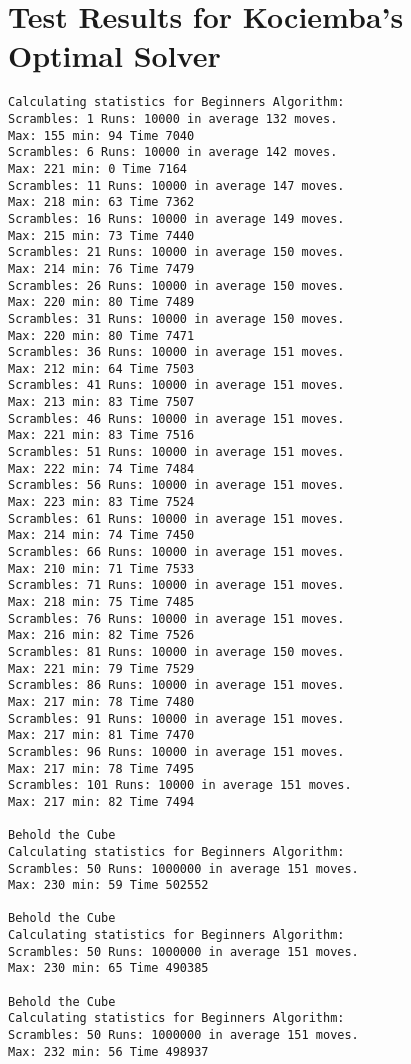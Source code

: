 \chapter{Test Results for Kociemba's Optimal Solver}
\label{chap:kociembaResults}
\emptyTop{}
\begin{lstlisting}[breaklines=true, basicstyle=\ttfamily\footnotesize]
Calculating statistics for Beginners Algorithm:
Scrambles: 1 Runs: 10000 in average 132 moves. 
Max: 155 min: 94 Time 7040
Scrambles: 6 Runs: 10000 in average 142 moves. 
Max: 221 min: 0 Time 7164
Scrambles: 11 Runs: 10000 in average 147 moves. 
Max: 218 min: 63 Time 7362
Scrambles: 16 Runs: 10000 in average 149 moves. 
Max: 215 min: 73 Time 7440
Scrambles: 21 Runs: 10000 in average 150 moves. 
Max: 214 min: 76 Time 7479
Scrambles: 26 Runs: 10000 in average 150 moves. 
Max: 220 min: 80 Time 7489
Scrambles: 31 Runs: 10000 in average 150 moves. 
Max: 220 min: 80 Time 7471
Scrambles: 36 Runs: 10000 in average 151 moves. 
Max: 212 min: 64 Time 7503
Scrambles: 41 Runs: 10000 in average 151 moves. 
Max: 213 min: 83 Time 7507
Scrambles: 46 Runs: 10000 in average 151 moves. 
Max: 221 min: 83 Time 7516
Scrambles: 51 Runs: 10000 in average 151 moves. 
Max: 222 min: 74 Time 7484
Scrambles: 56 Runs: 10000 in average 151 moves. 
Max: 223 min: 83 Time 7524
Scrambles: 61 Runs: 10000 in average 151 moves. 
Max: 214 min: 74 Time 7450
Scrambles: 66 Runs: 10000 in average 151 moves. 
Max: 210 min: 71 Time 7533
Scrambles: 71 Runs: 10000 in average 151 moves. 
Max: 218 min: 75 Time 7485
Scrambles: 76 Runs: 10000 in average 151 moves. 
Max: 216 min: 82 Time 7526
Scrambles: 81 Runs: 10000 in average 150 moves. 
Max: 221 min: 79 Time 7529
Scrambles: 86 Runs: 10000 in average 151 moves. 
Max: 217 min: 78 Time 7480
Scrambles: 91 Runs: 10000 in average 151 moves. 
Max: 217 min: 81 Time 7470
Scrambles: 96 Runs: 10000 in average 151 moves. 
Max: 217 min: 78 Time 7495
Scrambles: 101 Runs: 10000 in average 151 moves. 
Max: 217 min: 82 Time 7494

Behold the Cube
Calculating statistics for Beginners Algorithm:
Scrambles: 50 Runs: 1000000 in average 151 moves. 
Max: 230 min: 59 Time 502552

Behold the Cube
Calculating statistics for Beginners Algorithm:
Scrambles: 50 Runs: 1000000 in average 151 moves. 
Max: 230 min: 65 Time 490385

Behold the Cube
Calculating statistics for Beginners Algorithm:
Scrambles: 50 Runs: 1000000 in average 151 moves. 
Max: 232 min: 56 Time 498937
\end{lstlisting}
